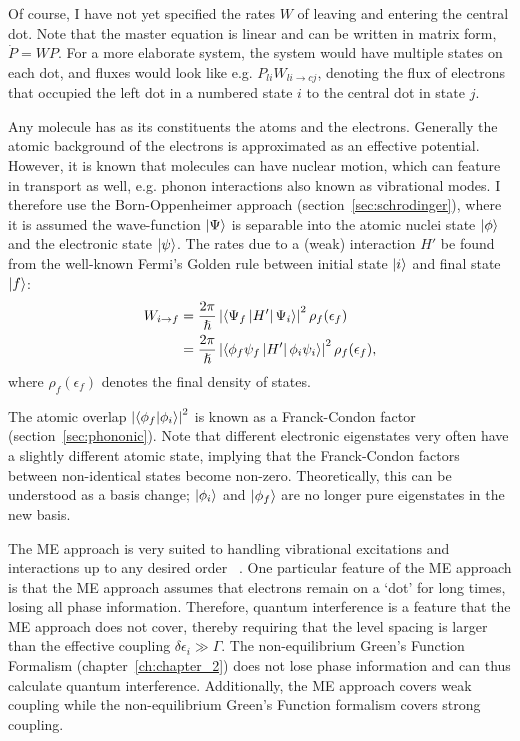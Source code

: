 Of course, I have not yet specified the rates $W$ of leaving and entering the central dot. Note that the master equation is linear and can be written in matrix form, $\dot{P} = W P$. For a more elaborate system, the system would have multiple states on each dot, and fluxes would look like e.g. $P_{li} W_{li\rightarrow cj}$, denoting the flux of electrons that occupied the left dot in a numbered state $i$ to the central dot in state $j$.  

Any molecule has as its constituents the atoms and the electrons. Generally the atomic background of the electrons is approximated as an effective potential. However, it is known that molecules can have nuclear motion, which can feature in transport as well, e.g. phonon interactions also known as vibrational modes. I therefore use the Born-Oppenheimer approach (section~\ref{sec:schrodinger}), where it is assumed the wave-function $\ket{\Psi}$ is separable into the atomic nuclei state $\ket{\phi}$ and the electronic state $\ket{\psi}$. The rates due to a (weak) interaction $H'$ be found from the well-known Fermi's Golden rule between initial state $\ket{i}$ and final state $\ket{f}$:
\begin{align*}
W_{i\rightarrow f}  &= \frac{2\pi}{\hslash} \left| \braket{\Psi_f \left|H'\right| \Psi_i}\right|^2 \rho_f (\epsilon_f)  \\
&= \frac{2\pi}{\hslash} \left| \braket{\phi_f \psi_f \left|H'\right| \phi_i \psi_i}\right|^2 \rho_f (\epsilon_f),
\end{align*}
where $\rho_f(\epsilon_f)$ denotes the final density of states. 

The atomic overlap $\left| \braket{ \phi_f | \phi_i }\right|^2$ is known as a Franck-Condon factor (section~\ref{sec:phononic}). Note that different electronic eigenstates very often have a slightly different atomic state, implying that the Franck\hyp{}Condon factors between non-identical states become non-zero. Theoretically, this can be understood as a basis change; $\ket{\phi_i}$ and $\ket{\phi_f}$ are no longer pure eigenstates in the new basis. 

The ME approach is very suited to handling vibrational excitations and interactions up to any desired order ~\cite{seldenthuis}. One particular feature of the ME approach is that the ME approach assumes that electrons remain on a `dot' for long times, losing all phase information. Therefore, quantum interference is a feature that the ME approach does not cover, thereby requiring that the level spacing is larger than the effective coupling $\delta \epsilon_i \gg \Gamma$. The non-equilibrium Green's Function Formalism (chapter~\ref{ch:chapter_2})  does not lose phase information and can thus calculate quantum interference. Additionally, the ME approach covers weak coupling while the non-equilibrium Green's Function formalism covers strong coupling.

